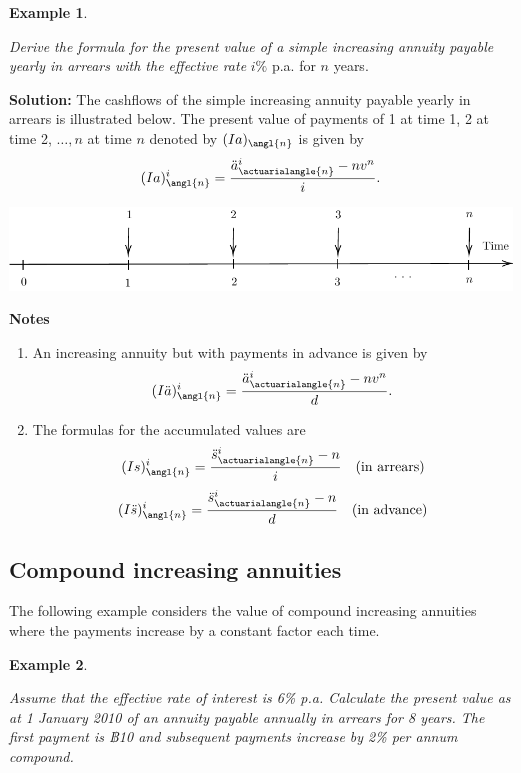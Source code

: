 \documentclass[landscape, 20pt]{extreport}
\theoremstyle{definition}
\theoremstyle{definition}
\newtheorem{example}{Example}[chapter]
\theoremstyle{definition}
\theoremstyle{definition}
\theoremstyle{remark}
\begin{document}
\newpage \begin{example}
\protect\hypertarget{exm:unlabeled-div-35}{}\label{exm:unlabeled-div-35}

\emph{Derive the formula for the present value of a simple increasing annuity
payable yearly in arrears with the effective rate} \(i\%\) p.a. for \(n\)
years.

\end{example}

\textbf{Solution:} The cashflows of the simple increasing annuity payable
yearly in arrears is illustrated below. The present value of payments of
1 at time 1, 2 at time 2, \(\ldots, n\) at time \(n\) denoted by
\((Ia)_\angl{n}\) is given by
\[(Ia)^{i}_\angl{n}   = \frac{\ddot{a}^{i}_{\actuarialangle{n}} - nv^n}{i}.\]

\begin{center}\includegraphics{tikz-ex19-1} \end{center}

\textbf{Notes}

\begin{enumerate}
\def\labelenumi{\arabic{enumi}.}
\item
  An increasing annuity but with payments in advance is given by
  \[(I\ddot{a})^{i}_\angl{n}   = \frac{\ddot{a}^{i}_{\actuarialangle{n}} - nv^n}{d}.\]
\item
  The formulas for the accumulated values are
  \[(Is)^{i}_\angl{n} = \frac{\ddot{s}^{i}_{\actuarialangle{n}} - n}{i} \quad\text{(in arrears)}\]
  \[(I\ddot{s})^{i}_\angl{n} = \frac{\ddot{s}^{i}_{\actuarialangle{n}} - n}{d} \quad\text{(in advance)}\]
\end{enumerate}

\newpage \hypertarget{compound-increasing-annuities}{%
\subsection{Compound increasing annuities}\label{compound-increasing-annuities}}

The following example considers the value of compound increasing
annuities where the payments increase by a constant factor each time.

\newpage \begin{example}
\protect\hypertarget{exm:unlabeled-div-36}{}\label{exm:unlabeled-div-36}

\emph{Assume that the effective rate of interest is 6\% p.a. Calculate the
present value as at 1 January 2010 of an annuity payable annually in
arrears for 8 years. The first payment is ฿10 and subsequent payments
increase by 2\% per annum compound.}

\end{example}
\end{document}
